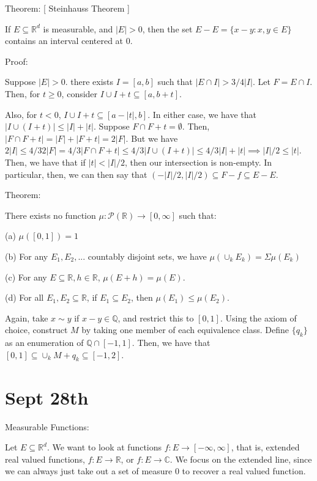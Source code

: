 \documentclass[10pt]{article}
\begin{document}
Theorem: [ Steinhauss Theorem ]

If $E \subseteq \mathbb{R}^d$ is measurable, and $|E| > 0$, then the set $E - E = \{ x - y : x, y \in E \}$ contains an interval centered at $0$. 

Proof:

Suppose $|E| > 0$. there exists $I = [a,b]$ such that $|E \cap I| > 3/4 |I|$. Let $ F = E \cap I$. Then, for $t \geq 0$, consider $I \cup I + t \subseteq [a,b+t]$.

Also, for $ t < 0$, $I \cup I + t \subseteq [a -  |t|,b]$. In either case, we have that $ | I \cup (I + t) | \leq |I| + |t| $. Suppose $F \cap F + t = \emptyset$. Then, $|F \cap F + t | = |F| + |F + t| = 2|F|$. But we have $2 |I| \leq 4/3 2|F| = 4/3 |F \cap F + t | \leq 4/3  | I \cup (I + t) | \leq 4/3 |I| + |t|  \implies |I|/2 \leq |t|$. Then, we have that if $|t| < |I|/2$, then our intersection is non-empty. In particular, then, we can then say that $(-|I|/2, |I|/2) \subseteq F- f \subseteq E - E $. 

Theorem:

There exists no function $\mu: \mathcal{P}(\mathbb{R}) \to [0,\infty]$ such that:

(a) $\mu([0,1])  = 1$

(b) For any $E_1,E_2,...$ countably disjoint sets, we have $\mu(\cup_k E_k) = \Sigma \mu(E_k)$

(c) For any $E \subseteq \mathbb{R}, h \in \mathbb{R}$, $\mu(E + h) = \mu(E)$.

(d) For all $E_1,E_2 \subseteq \mathbb{R}$, if $E_1 \subseteq E_2$, then $\mu(E_1) \leq \mu(E_2)$.

Again, take $x \sim y$ if $x -y \in \mathbb{Q}$, and restrict this to $[0,1]$. Using the axiom of choice, construct $M$ by taking one member of each equivalence class. Define $\{ q_k \}$ as an enumeration of $ \mathbb{Q} \cap [-1,1]$. Then, we have that $[0,1] \subseteq \cup_k M + q_k \subseteq [-1,2]$.

\section*{Sept 28th}

Measurable Functions:

Let $E \subseteq \mathbb{R}^d$. We want to look at functions $f : E \to [-\infty, \infty]$, that is, extended real valued functions, $f : E \to \mathbb{R}$, or $f : E \to \mathbb{C}$. We focus on the extended line, since we can always just take out a set of measure 0 to recover a real valued function.
\end{document}
